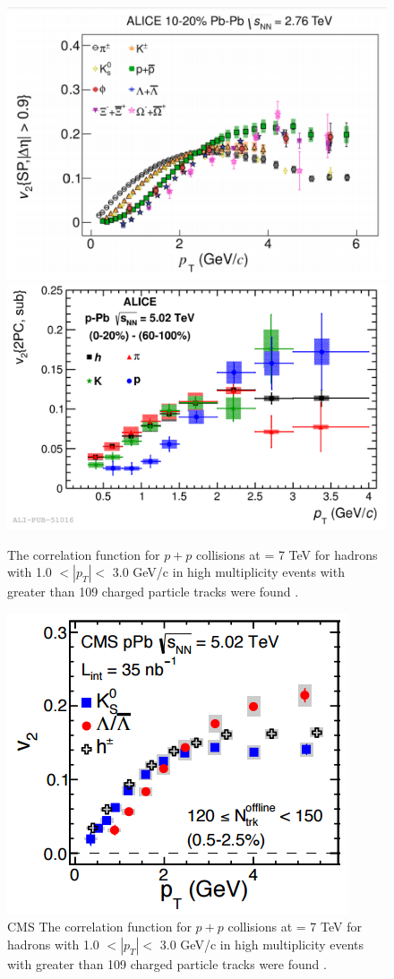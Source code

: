 \begin{figure}[h!]
\begin{center}
\includegraphics[width=0.48\linewidth]{figs/PbPb_v2_mass_ordering.PNG}
\includegraphics[width=0.48\linewidth]{figs/pPb_two_part_v2_mass_ordering.PNG}
\caption{ The correlation function for $p+p$ collisions at \sqsn = 7 TeV for hadrons with 1.0 $<|p_T|<$ 3.0 GeV/c in high multiplicity events with greater than 109 charged particle tracks were found \cite{Khachatryan2010}.}
\label{fig:pp_ridge_plot}
\end{center}
\end{figure}

\begin{figure}[h!]
\begin{center}
\includegraphics[width=0.55\linewidth]{figs/pBp_v2_mass_ordering.PNG}
\caption{ CMS The correlation function for $p+p$ collisions at \sqsn = 7 TeV for hadrons with 1.0 $<|p_T|<$ 3.0 GeV/c in high multiplicity events with greater than 109 charged particle tracks were found \cite{Khachatryan2010}.}
\label{fig:pp_ridge_plot}
\end{center}
\end{figure}

